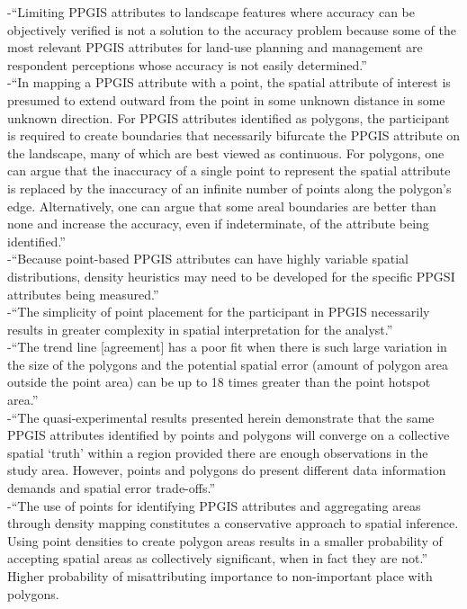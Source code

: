 -{\color{orange}“Limiting PPGIS attributes to landscape features where accuracy can be objectively verified is not a solution to the accuracy problem because some of the most relevant PPGIS attributes for land-use planning and management are respondent perceptions whose accuracy is not easily determined.”  \cite{Brown2012}}\\
-{\color{orange}“In mapping a PPGIS attribute with a point, the spatial attribute of interest is presumed to extend outward from the point in some unknown distance in some unknown direction. For PPGIS attributes identified as polygons, the participant is required to create boundaries that necessarily bifurcate the PPGIS attribute on the landscape, many of which are best viewed as continuous. For polygons, one can argue that the inaccuracy of a single point to represent the spatial attribute is replaced by the inaccuracy of an infinite number of points along the polygon’s edge. Alternatively, one can argue that some areal boundaries are better than none and increase the accuracy, even if indeterminate, of the attribute being identified.”\cite{Brown2012}}\\
-{\color{orange}“Because point-based PPGIS attributes can have highly variable spatial distributions, density heuristics may need to be developed for the specific PPGSI attributes being measured.”\cite{Brown2012}}\\
-{\color{orange}“The simplicity of point placement for the participant in PPGIS necessarily results in greater complexity in spatial interpretation for the analyst.”\cite{Brown2012}}\\
-{\color{orange}“The trend line [agreement] has a poor fit when there is such large variation in the size of the polygons and the potential spatial error (amount of polygon area outside the point area) can be up to 18 times greater than the point hotspot area.”\cite{Brown2012}}\\
-{\color{orange}“The quasi-experimental results presented herein demonstrate that the same PPGIS attributes identified by points and polygons will converge on a collective spatial ‘truth’ within a region provided there are enough observations in the study area. However, points and polygons do present different data information demands and spatial error trade-offs.”\cite{Brown2012}}\\
-{\color{orange}“The use of points for identifying PPGIS attributes and aggregating areas through density mapping constitutes a conservative approach to spatial inference. Using point densities to create polygon areas results in a smaller probability of accepting spatial areas as collectively significant, when in fact they are not.” Higher probability of misattributing importance to non-important place with polygons.\cite{Brown2012}}\\
